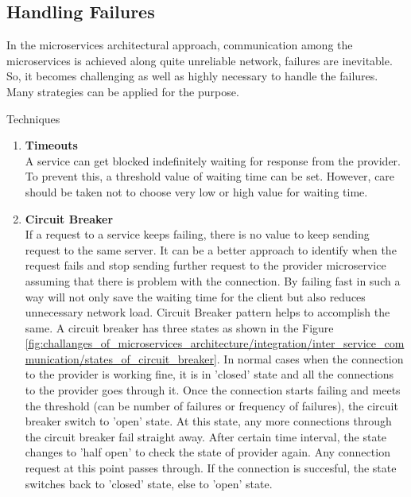 \subsection{Handling Failures}\label{section:challanges_of_microservices_architecture/handling_failures}
In the microservices architectural approach, communication among the microservices is achieved along quite unreliable network, failures are inevitable. So, it becomes challenging as well as highly necessary to handle the failures. Many strategies can be applied for the purpose. \cite{Newman:2015aa}\cite{Richardson:2015ab}\cite{Nygard:2007aa}
\begin{shaded}Techniques\end{shaded}
\begin{enumerate}
\item \textbf{Timeouts} \\ A service can get blocked indefinitely waiting for response from the provider. To prevent this, a threshold value of waiting time can be set. However, care should be taken not to choose very low or high value for waiting time. 
\item \textbf{Circuit Breaker} \\ If a request to a service keeps failing, there is no value to keep sending request to the same server. It can be a better approach to identify when the request fails and stop sending further request to the provider microservice assuming that there is problem with the connection. By failing fast in such a way will not only save the waiting time for the client but also reduces unnecessary network load. Circuit Breaker pattern helps to accomplish the same. A circuit breaker has three states as shown in the Figure \ref{fig:challanges_of_microservices_architecture/integration/inter_service_communication/states_of_circuit_breaker}. In normal cases when the connection to the provider is working fine, it is in 'closed' state and all the connections to the provider goes through it. Once the connection starts failing and meets the threshold (can be number of failures or frequency of failures), the circuit breaker switch to 'open' state. At this state, any more connections through the circuit breaker fail straight away. After certain time interval, the state changes to 'half open' to check the state of provider again. Any connection request at this point passes through. If the connection is succesful, the state switches back to 'closed' state, else to 'open' state.\cite{Fowler:2014ac} \cite{Newman:2015aa} \cite{Nygard:2007aa}
\begin{figure}[H]

\end{figure}
\end{enumerate}
